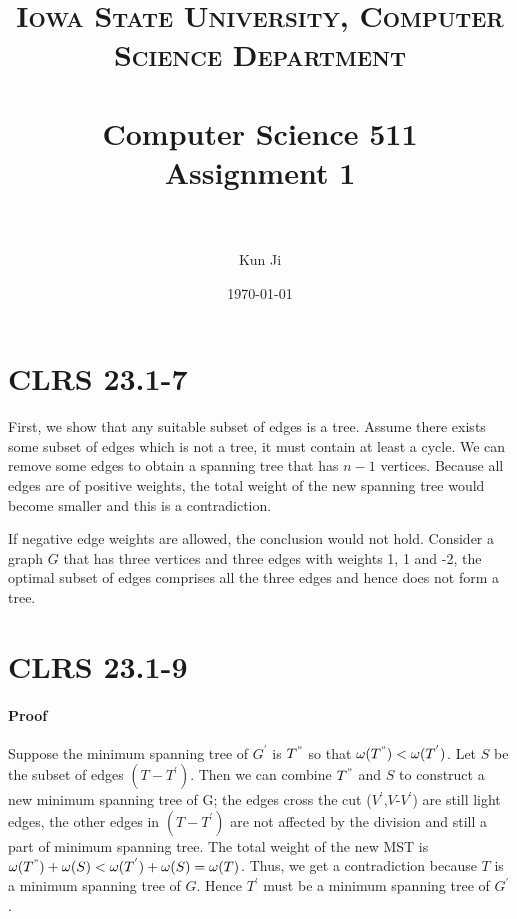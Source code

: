 \documentclass[paper=a4, fontsize=12pt]{scrartcl} %
\title{	
\normalfont \normalsize 
\textsc{Iowa State University, Computer Science Department} \\ [25pt] %
\horrule{0.5pt} \\[0.4cm] %
\huge Computer Science 511 \\ Assignment 1 \\ %
\horrule{2pt} \\[0.5cm] %
}
\author{Kun Ji} %
\date{\normalsize\today} %
\numberwithin{equation}{section} %
\numberwithin{figure}{section} %
\numberwithin{table}{section} %
\begin{document}
\maketitle %

\section{CLRS 23.1-7}
First, we show that any suitable subset of edges is a tree. Assume there exists some subset of edges which is not a tree, it must contain at least a cycle. We can remove some edges to obtain a spanning tree that has $n - 1$ vertices. Because all edges are of positive weights, the total weight of the new spanning tree would become smaller and this is a contradiction.\par
If negative edge weights are allowed, the conclusion would not hold. Consider a graph $G$ that has three vertices and three edges with weights 1, 1 and -2, the optimal subset of edges comprises all the three edges and hence does not form a tree.

\section{CLRS 23.1-9}

\paragraph{Proof} Suppose the minimum spanning tree of $G^{'}$ is $T^{"}$ so that $\omega(T^{"}) < \omega(T^{'})$. Let $S$ be the subset of edges $(T - T^{'})$. Then we can combine $T^{"}$ and $S$ to construct a new minimum spanning tree of G; the edges cross the cut ($V^{'}$,$V$-$V^{'}$) are still light edges, the other edges in $(T - T^{'})$ are not affected by the division and still a part of minimum spanning tree. The total weight of the new MST is 
$\omega(T^{"})+\omega(S) < \omega(T^{'})+\omega(S) = \omega(T)$. Thus, we get a contradiction because $T$ is a minimum spanning tree of $G$. Hence $T^{'}$ must be a minimum spanning tree of $G^{'}$.

\end{document}
